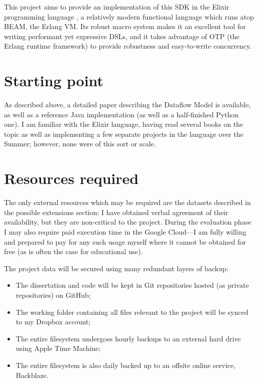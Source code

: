 \documentclass[11pt]{scrartcl}
\begin{document}
This project aims to provide an implementation of this SDK in the Elixir programming language \cite{Elixir}, a relatively modern functional language which runs atop BEAM, the Erlang VM. Its robust macro system makes it an excellent tool for writing performant yet expressive DSLs, and it takes advantage of OTP (the Erlang runtime framework) to provide robustness and easy-to-write concurrency.

\section*{Starting point}

As described above, a detailed paper describing the Dataflow Model is available, as well as a reference Java implementation (as well as a half-finished Python one). I am familiar with the Elixir language, having read several books on the topic as well as implementing a few separate projects in the language over the Summer; however, none were of this sort or scale.

\section*{Resources required}

The only external resources which may be required are the datasets described in the possible extensions section; I have obtained verbal agreement of their availability, but they are non-critical to the project. During the evaluation phase I may also require paid execution time in the Google Cloud---I am fully willing and prepared to pay for any such usage myself where it cannot be obtained for free (as is often the case for educational use).

The project data will be secured using many redundant layers of backup:

\begin{itemize}
	\item The dissertation and code will be kept in Git repositories hosted (as private repositories) on GitHub;
	\item The working folder containing all files relevant to the project will be synced to my Dropbox account;
	\item The entire filesystem undergoes hourly backups to an external hard drive using Apple Time Machine;
	\item The entire filesystem is also daily backed up to an offsite online service, Backblaze.
\end{itemize}
\end{document}
